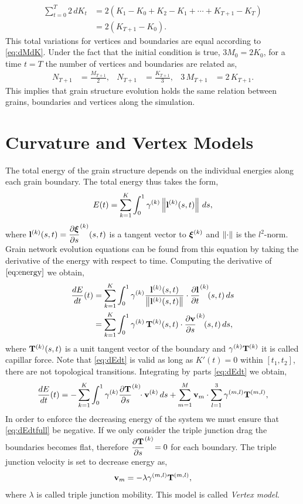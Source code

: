\begin{align*}
    \sum_{t=0}^{T}2\,dK_t &= 2(K_1 - K_0 + K_2 - K_1 + \cdots + K_{T+1} - K_T) \\
    &= 2(K_{T+1} - K_0).
\end{align*}
This total variations for vertices and boundaries are equal according to \eqref{eq:dMdK}. 
Under the fact that the initial condition is true, \ie  $3M_0 = 2K_0$, for a time $t=T$ the number of vertices and boundaries are related as,
\begin{align*}
    N_{T+1} &= \frac{M_{T+1}}{2},
    & N_{T+1} &= \frac{K_{T+1}}{3},
    & 3\,M_{T+1} &= 2\,K_{T+1}.
\end{align*}
This implies that grain structure evolution holds the same relation between grains, boundaries and vertices along the simulation.

\section{Curvature and Vertex Models}
%
The total energy of the grain structure depends on the individual energies along each grain boundary. 
The total energy thus takes the form,
\begin{equation}
    E(t) = \sum_{k=1}^{K} \int_0^1 \gamma ^{(k)}\left\lVert\mathbf{l}^{(k)}(s,t)\right\rVert\, ds,
    \label{eq:energy}
\end{equation}
where $\mathbf{l}^{(k)}(s,t) = \dfrac{\partial \bm{\xi}}{\partial s}^{(k)}(s,t)$ is a tangent vector to $\bm{\xi}^{(k)}$ and $\left\lVert\cdot\right\rVert$ is the $l^2$-norm. Grain network evolution equations can be found from this equation by taking the derivative of the energy with respect to time. 
Computing the derivative of $\eqref{eq:energy}$ we obtain,
\begin{align}
    \dfrac{dE}{dt}(t) &= \sum_{k=1}^{K} \int_0^1 \gamma^{(k)} \dfrac{\mathbf{l}^{(k)}(s,t)}{\left\lVert\mathbf{l}^{(k)}(s,t)\right\rVert} \cdot \dfrac{\partial \mathbf{l}}{\partial t}^{(k)}\!(s,t) \, ds \nonumber\\
    &= \sum_{k=1}^{K} \int_0^1 \gamma^{(k)}\, \mathbf{T}^{(k)}(s,t) \cdot \dfrac{\partial \mathbf{v}}{\partial s}^{(k)}\!(s,t) \, ds \label{eq:dEdt},
\end{align}
where $\mathbf{T}^{(k)}(s,t)$ is a unit tangent vector of the boundary and $\gamma^{(k)}\mathbf{T}^{(k)}$ it is called capillar force. 
Note that \eqref{eq:dEdt} is valid as long as $K'(t) = 0$ within $[t_1, t_2]$, \ie
there are not topological transitions. 
Integrating by parts \eqref{eq:dEdt} we obtain,
\begin{equation}
    \dfrac{dE}{dt}(t) = -\sum_{k=1}^K \int_0^1 \gamma^{(k)}\dfrac{\partial \mathbf{T}}{\partial s}^{(k)}\!\!\cdot \mathbf{v}^{(k)}\, ds + \sum_{m=1}^M \mathbf{v}_m \cdot \sum_{l=1}^{3} \gamma^{(m,l)}\mathbf{T}^{(m,l)}
    \label{eq:dEdtfull},
\end{equation}
In order to enforce the decreasing energy of the system we must ensure that \eqref{eq:dEdtfull} be negative. 
If we only consider the triple junction drag the boundaries becomes flat, therefore $\dfrac{\partial \mathbf{T}}{\partial s}^{(k)}\! = 0$ for each boundary. 
The triple junction velocity is set to decrease energy as,
\begin{equation*}
    \mathbf{v}_{m} = - \lambda \gamma^{(m,l)}\mathbf{T}^{(m,l)},
\end{equation*}
where $\lambda$ is called triple junction mobility. 
This model is called \emph{Vertex model}. 

